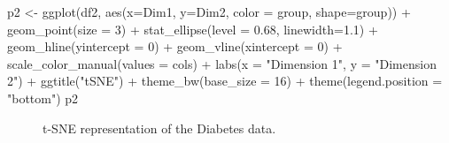 \documentclass[
  letterpaper,
  10pt,
  krantz2]{krantz}
\makeatletter
\newenvironment{Shaded}{\begin{snugshade}}{\end{snugshade}}
\newcommand{\AttributeTok}[1]{\textcolor[rgb]{0.40,0.45,0.13}{#1}}
\newcommand{\DecValTok}[1]{\textcolor[rgb]{0.68,0.00,0.00}{#1}}
\newcommand{\FloatTok}[1]{\textcolor[rgb]{0.68,0.00,0.00}{#1}}
\newcommand{\FunctionTok}[1]{\textcolor[rgb]{0.28,0.35,0.67}{#1}}
\newcommand{\NormalTok}[1]{\textcolor[rgb]{0.00,0.23,0.31}{#1}}
\newcommand{\OtherTok}[1]{\textcolor[rgb]{0.00,0.23,0.31}{#1}}
\newcommand{\SpecialCharTok}[1]{\textcolor[rgb]{0.37,0.37,0.37}{#1}}
\newcommand{\StringTok}[1]{\textcolor[rgb]{0.13,0.47,0.30}{#1}}
\newenvironment{kframe}{%
  \medskip{}
  \setlength{\fboxsep}{.8em}
  \def\at@end@of@kframe{}%
  \ifinner\ifhmode%
  \def\at@end@of@kframe{\end{minipage}}%
  \begin{minipage}{\columnwidth}%
  \fi\fi%
  \def\FrameCommand##1{\hskip\@totalleftmargin \hskip-\fboxsep
  \colorbox{shadecolor}{##1}\hskip-\fboxsep
      \hskip-\linewidth \hskip-\@totalleftmargin \hskip\columnwidth}%
  \MakeFramed {\advance\hsize-\width
    \@totalleftmargin\z@ \linewidth\hsize
    \@setminipage}}%
{\par\unskip\endMakeFramed%
  \at@end@of@kframe}
\renewenvironment{Shaded}{\begin{kframe}}{\end{kframe}}
\makeatother
\begin{document}
\begin{Shaded}
\begin{Highlighting}[]
\NormalTok{p2 }\OtherTok{\textless{}{-}} \FunctionTok{ggplot}\NormalTok{(df2, }\FunctionTok{aes}\NormalTok{(}\AttributeTok{x=}\NormalTok{Dim1, }\AttributeTok{y=}\NormalTok{Dim2, }\AttributeTok{color =}\NormalTok{ group, }\AttributeTok{shape=}\NormalTok{group)) }\SpecialCharTok{+} 
  \FunctionTok{geom\_point}\NormalTok{(}\AttributeTok{size =} \DecValTok{3}\NormalTok{) }\SpecialCharTok{+} 
  \FunctionTok{stat\_ellipse}\NormalTok{(}\AttributeTok{level =} \FloatTok{0.68}\NormalTok{, }\AttributeTok{linewidth=}\FloatTok{1.1}\NormalTok{) }\SpecialCharTok{+}
  \FunctionTok{geom\_hline}\NormalTok{(}\AttributeTok{yintercept =} \DecValTok{0}\NormalTok{) }\SpecialCharTok{+}
  \FunctionTok{geom\_vline}\NormalTok{(}\AttributeTok{xintercept =} \DecValTok{0}\NormalTok{) }\SpecialCharTok{+}
  \FunctionTok{scale\_color\_manual}\NormalTok{(}\AttributeTok{values =}\NormalTok{ cols) }\SpecialCharTok{+}
  \FunctionTok{labs}\NormalTok{(}\AttributeTok{x =} \StringTok{"Dimension 1"}\NormalTok{,}
       \AttributeTok{y =} \StringTok{"Dimension 2"}\NormalTok{) }\SpecialCharTok{+} 
  \FunctionTok{ggtitle}\NormalTok{(}\StringTok{"tSNE"}\NormalTok{) }\SpecialCharTok{+}
  \FunctionTok{theme\_bw}\NormalTok{(}\AttributeTok{base\_size =} \DecValTok{16}\NormalTok{) }\SpecialCharTok{+}
  \FunctionTok{theme}\NormalTok{(}\AttributeTok{legend.position =} \StringTok{"bottom"}\NormalTok{) }
\NormalTok{p2}
\end{Highlighting}
\end{Shaded}

\begin{figure}[H]


\caption{\label{fig-diabetes-tsne}t-SNE representation of the Diabetes
data.}

\end{figure}%
\end{document}
